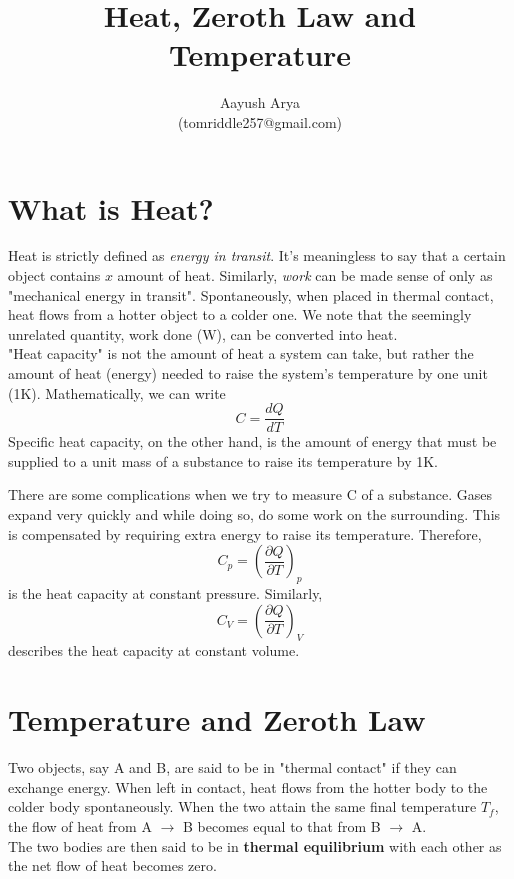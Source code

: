 \documentclass{article}
\title{Heat, Zeroth Law and Temperature}
\author{Aayush Arya\\ (tomriddle257@gmail.com)}
\begin{document}
	
	\maketitle
	
	\section*{What is Heat?}
	Heat is strictly defined as \textit{energy in transit}. It's meaningless to say that a certain object contains $x$ amount of heat. Similarly, \textit{work} can be made sense of only as "mechanical energy in transit". Spontaneously, when placed in thermal contact, heat flows from a hotter object to a colder one. We note that the seemingly unrelated quantity, work done (W), can be converted into heat. \\
	
	"Heat capacity" is not the amount of heat a system can take, but rather the amount of heat (energy) needed to raise the system's temperature by one unit (1K). Mathematically, we can write
	$$ C = \frac{dQ}{dT}$$
	Specific heat capacity, on the other hand, is the amount of energy that must be supplied to a unit mass of a substance to raise its temperature by 1K.
	
	There are some complications when we try to measure C of a substance. Gases expand very quickly and while doing so, do some work on the surrounding. This is compensated by requiring extra energy to raise its temperature. Therefore,
	$$ C_p = \left(\frac{\partial Q}{\partial T}\right)_p $$
	is the heat capacity at constant pressure. Similarly,
	\begin{equation*}
	C_V = \left(\frac{\partial Q}{\partial T}\right)_V
	\end{equation*}
	 describes the heat capacity at constant volume.
	 
	 \section*{Temperature and Zeroth Law}
	 Two objects, say A and B, are said to be in "thermal contact" if they can exchange energy. When left in contact, heat flows from the hotter body to the colder body spontaneously. When the two attain the same final temperature $T_f$, the flow of heat from A $\rightarrow$ B becomes equal to that from B $\rightarrow$ A.\\
	 The two bodies are then said to be in \textbf{thermal equilibrium} with each other as the net flow of heat becomes zero. \\
	 
\end{document}
